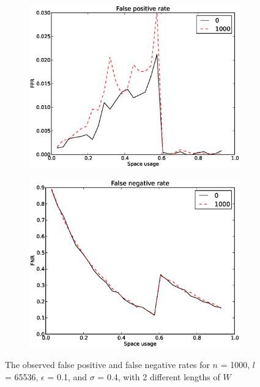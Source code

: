 \documentclass[a4paper,11pt]{article}
\begin{document}
\begin{figure}[H]
\centering
\begin{subfigure}{.5\textwidth}
  \centering
  \includegraphics[width=.95\linewidth]{wildcard_1000_FPR1}
\end{subfigure}%
\begin{subfigure}{.5\textwidth}
  \centering
  \includegraphics[width=.95\linewidth]{wildcard_1000_FNR1}
\end{subfigure}
\caption{The observed false positive and false negative rates for $n$ = 1000, $l$ = 65536, $\epsilon$ = 0.1, and $\sigma$ = 0.4, with 2 different lengths of $W$}
\label{fig:w-fpnr}
\end{figure}
\end{document}
